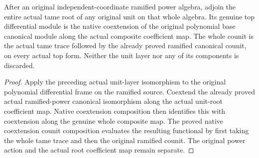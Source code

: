 \begin{theorem}
\label{thm:kn-nadel-canonical-power-unit-composition}

After an original independent-coordinate ramified power algebra,
adjoin the entire actual tame root of any original unit on that
whole algebra.  Its genuine top differential module is the native
coextension of the original polynomial base canonical module along
the actual composite coefficient map.  The whole counit is the
actual tame trace followed by the already proved ramified canonical
counit, on every actual top form.  Neither the unit layer nor any
of its components is discarded.
\end{theorem}
\begin{proof}
Apply the preceding actual unit-layer isomorphism to the original
polynomial differential frame on the ramified source.  Coextend the
already proved actual ramified-power canonical isomorphism along
the actual unit-root coefficient map.  Native coextension composition
then identifies this with coextension along the genuine whole
composite map.  The proved native coextension counit composition
evaluates the resulting functional by first taking the whole tame
trace and then the original ramified counit.  The original power
action and the actual root coefficient map remain separate.
\end{proof}

